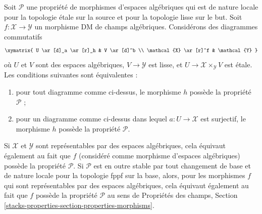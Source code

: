 \begin{lemma}
\label{lemma-etale-smooth-local-source-target}
Soit $\mathcal{P}$ une propriété de morphismes d'espaces algébriques
qui est de nature locale pour la topologie \'etale sur la source et pour la topologie lisse sur le but.
Soit $f : \mathcal{X} \to \mathcal{Y}$ un morphisme DM de champs algébriques.
Considérons des diagrammes commutatifs
$$
\xymatrix{
U \ar[d]_a \ar[r]_h & V \ar[d]^b \\
\mathcal{X} \ar[r]^f & \mathcal{Y}
}
$$
où $U$ et $V$ sont des espaces algébriques, $V \to \mathcal{Y}$ est lisse,
et $U \to \mathcal{X} \times_\mathcal{Y} V$ est \'etale.
Les conditions suivantes sont équivalentes :
\begin{enumerate}
\item pour tout diagramme comme ci-dessus, le morphisme $h$ possède la propriété $\mathcal{P}$ ;
\item pour un diagramme comme ci-dessus dans lequel $a : U \to \mathcal{X}$ est surjectif,
le morphisme $h$ possède la propriété $\mathcal{P}$.
\end{enumerate}
Si $\mathcal{X}$ et $\mathcal{Y}$ sont représentables par des espaces algébriques,
cela équivaut également au fait que $f$ (considéré comme morphisme d'espaces algébriques)
possède la propriété $\mathcal{P}$. Si $\mathcal{P}$ est en outre stable par
tout changement de base et de nature locale pour la topologie fppf sur la base, alors, pour les morphismes $f$
qui sont représentables par des espaces algébriques,
cela équivaut également au fait que $f$ possède la propriété $\mathcal{P}$ au sens
de
Propriétés des champs,
Section \ref{stacks-properties-section-properties-morphisms}.
\end{lemma}

